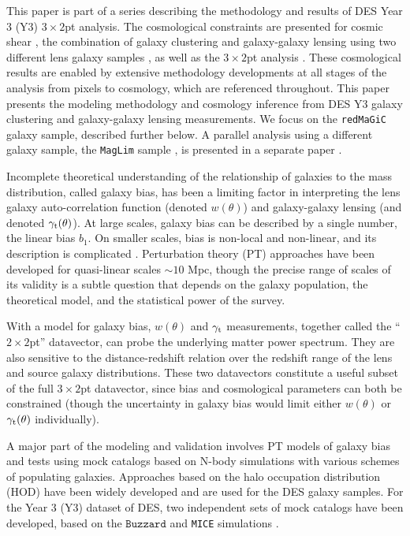 \documentclass[aps, prd,twocolumn,superscriptaddress,nofootinbib,preprintnumbers]{revtex4-1}
\newcommand{\redmagic}{\texttt{redMaGiC} }
\newcommand{\mice}{\texttt{MICE} }
\newcommand{\maglim}{\texttt{MagLim} }
\newcommand{\buzzard}{\texttt{Buzzard} }
\begin{document}
This paper is part of a series describing the methodology and results of DES Year 3 (Y3) $3\times2$pt analysis. The cosmological constraints are presented for cosmic shear \citep{y3-cosmicshear1,y3-cosmicshear2}, the combination of galaxy clustering and galaxy-galaxy lensing using two different lens galaxy samples \citep[this paper; ][]{y3-2x2ptaltlensresults,y3-2x2ptmagnification}, as well as the $3\times2$pt analysis \citep{y3-3x2ptkp}. These cosmological results are enabled by extensive methodology developments at all stages of the analysis from pixels to cosmology, which are referenced throughout. This paper presents the modeling methodology and cosmology inference from DES Y3 galaxy clustering \citep{y3-galaxyclustering} and galaxy-galaxy lensing \citep{y3-gglensing} measurements. 
We focus on the \redmagic \citep{Rozo_2016} galaxy sample, described further below. A parallel analysis using a different galaxy sample, the \maglim sample \citep{y3-2x2maglimforecast}, is presented in a separate paper \citep{y3-2x2ptaltlensresults}.


Incomplete theoretical understanding of the relationship of galaxies to the mass distribution, called galaxy bias, has been a limiting factor in interpreting the lens galaxy auto-correlation function (denoted $w(\theta)$) and galaxy-galaxy lensing (and denoted $\gamma_{\rm t}(\theta)$). At large scales, galaxy bias can be described by a single number, the linear bias $b_1$. On smaller scales, bias is non-local and non-linear, and its description is complicated \citep{Fry_93,Scherrer_98}. Perturbation theory (PT) approaches have been developed for quasi-linear scales $\sim 10$ Mpc, though the precise range of scales of its validity is a subtle question that depends on the galaxy population, the theoretical model, and the statistical power of the survey. 

With a model for galaxy bias, $w(\theta)$ and $\gamma_{\rm t}$ measurements, together called the ``$2\times2$pt'' datavector, can probe the underlying matter power spectrum. They are also sensitive to the distance-redshift relation over the redshift range of the lens and source galaxy distributions.  These two datavectors constitute a useful subset of the full $3\times 2$pt datavector, %
since bias and cosmological parameters can both be constrained (though the uncertainty in galaxy bias would limit either $w(\theta)$ or $\gamma_{\rm t}(\theta)$ individually). 


A major part of the modeling and validation involves PT models of galaxy bias and tests using mock catalogs based on N-body simulations with various schemes of populating galaxies. 
Approaches based on the halo occupation distribution (HOD) have been widely developed and are used for the DES galaxy samples. For the Year 3 (Y3) dataset of DES, two independent sets of mock catalogs have been developed, based on the $\buzzard$\citep{DeRose2019} and \mice simulations \citep{Fosalba_2014, Crocce_2015, Fosalba_2015}. 
\end{document}
